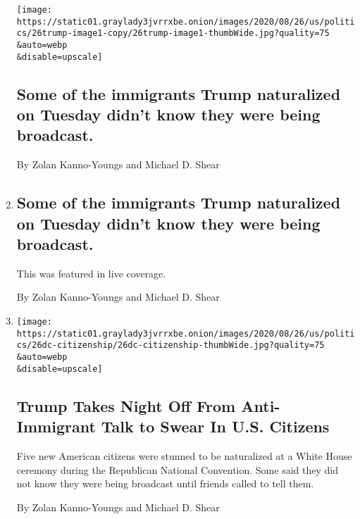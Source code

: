 \begin{enumerate}
  \texttt{[image: https://static01.graylady3jvrrxbe.onion/images/2020/08/26/us/politics/26trump-image1-copy/26trump-image1-thumbWide.jpg?quality=75\\\&auto=webp\\\&disable=upscale]}

  \hypertarget{some-of-the-immigrants-trump-naturalized-on-tuesday-didnt-know-they-were-being-broadcast}{%
  \subsection{Some of the immigrants Trump naturalized on Tuesday didn't
  know they were being
  broadcast.}\label{some-of-the-immigrants-trump-naturalized-on-tuesday-didnt-know-they-were-being-broadcast}}

  By Zolan Kanno-Youngs and Michael D. Shear
\item
  \href{/live/2020/08/26/us/rnc-convention-election/some-of-the-immigrants-trump-naturalized-on-tuesday-didnt-know-they-were-being-broadcast}{}

  \hypertarget{some-of-the-immigrants-trump-naturalized-on-tuesday-didnt-know-they-were-being-broadcast-1}{%
  \subsection{Some of the immigrants Trump naturalized on Tuesday didn't
  know they were being
  broadcast.}\label{some-of-the-immigrants-trump-naturalized-on-tuesday-didnt-know-they-were-being-broadcast-1}}

  This was featured in live coverage.

  By Zolan Kanno-Youngs and Michael D. Shear
\item
  \href{/2020/08/26/us/politics/trump-naturalization-ceremony-rnc.html}{}

  \texttt{[image: https://static01.graylady3jvrrxbe.onion/images/2020/08/26/us/politics/26dc-citizenship/26dc-citizenship-thumbWide.jpg?quality=75\\\&auto=webp\\\&disable=upscale]}

  \hypertarget{trump-takes-night-off-from-anti-immigrant-talk-to-swear-in-us-citizens}{%
  \subsection{Trump Takes Night Off From Anti-Immigrant Talk to Swear In
  U.S.
  Citizens}\label{trump-takes-night-off-from-anti-immigrant-talk-to-swear-in-us-citizens}}

  Five new American citizens were stunned to be naturalized at a White
  House ceremony during the Republican National Convention. Some said
  they did not know they were being broadcast until friends called to
  tell them.

  By Zolan Kanno-Youngs and Michael D. Shear
\end{enumerate}

